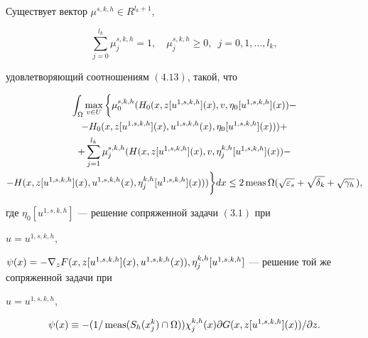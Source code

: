 \begin{lems} 


Существует вектор $\mu^{s,k,h}\in R^{l_k+1}$, 


$$ 


\sum^{l_k}_{j=0}\mu^{s,k,h}_j=1,\quad 


\mu^{s,k,h}_j\ge0,\ \; j=0,1,\dotsc,l_k, 


$$ 


удовлетворяющий соотношениям $(4.13)$, такой, что 


\begin{multline*} 


\int_\Omega\max_{v\in U}\bigg\{\mu^{s,k,h}_0(H_0


(x,z[u^{1,s,k,h}](x),v,\eta_0[u^{1,s,k,h}](x))- \\


%


-H_0(x,z[u^{1,s,k,h}](x),u^{1,s,k,h}(x),\eta_0 


[u^{1,s,k,h}](x)))+ \\ 


% 


+\sum^{l_k}_{j=1}\mu^{s,k,h}_j(H(x,z[u^{1,s,k,h}](x),v, 


\eta^{k,h}_j[u^{1,s,k,h}](x))- \\


%


-H(x,z[u^{1,s,k,h}](x),u^{1,s,k,h}(x),\eta^{k,h}_j 


[u^{1,s,k,h}](x)))\bigg\}dx\le 2\meas\Omega 


(\sqrt{\varepsilon_s}+\sqrt{\delta_k}+\sqrt{\gamma_h}\,), 


\end{multline*} 


где $\eta_0[u^{1,s,k,h}]$ --- решение сопряженной задачи $(3.1)$ при 


$u=u^{1,s,k,h}$, 


$\psi(x)=-\nabla_z F(x,z[u^{1,s,k,h}](x),\linebreak u^{1,s,k,h}(x)), 


\eta^{k,h}_j[u^{1,s,k,h}]$ --- решение той же сопряженной задачи при 


$u=u^{1,s,k,h}$, 


$$ 


\psi(x)\equiv-(1/\meas(S_h(x^k_j)\cap\Omega))


\chi^{k,h}_j(x)\partial G(x,z[u^{1,s,k,h}](x))/\partial z. 


$$ 


\end{lems} 


